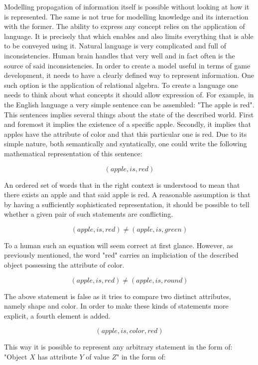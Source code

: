 
Modelling propagation of information itself is possible without looking at how it is represented.
The same is not true for modelling knowledge and its interaction with the former.
The ability to express any concept relies on the application of language.
It is precisely that which enables and also limits everything that is able to be conveyed using it.
Natural language is very complicated and full of inconsistencies.
Human brain handles that very well and in fact often is the source of said inconsistencies.
In order to create a model useful in terms of game development, it needs to have a clearly defined way to represent information.
One such option is the application of relational algebra.
To create a language one needs to think about what concepts it should allow expression of.
For example, in the English language a very simple sentence can be assembled: "The apple is red".
This sentences implies several things about the state of the described world.
First and foremost it implies the existence of a specific apple.
Secondly, it implies that apples have the attribute of color and that this particular one is red.
Due to its simple nature, both semantically and syntatically, one could write the following mathematical representation of this sentence:

$$
    \left( apple, is, red \right)
$$

An ordered set of words that in the right context is understood to mean that there exists an apple and that said apple is red.
A reasonable assumption is that by having a sufficiently sophisticated representation, it should be possible to tell whether a given pair of such statements are conflicting.

$$
    \left( apple, is, red \right) \neq \left( apple, is, green \right)
$$

To a human such an equation will seem correct at first glance.
However, as previously mentioned, the word "red" carries an impliciation of the described object possessing the attribute of color.

$$
    \left( apple, is, red \right) \neq \left( apple, is, round \right)
$$

The above statement is false as it tries to compare two distinct attributes, namely shape and color.
In order to make these kinds of statements more explicit, a fourth element is added.

$$
    \left( apple, is, color, red \right)
$$

This way it is possible to represent any arbitrary statement in the form of: "Object $X$ has attribute $Y$ of value $Z$" in the form of:

